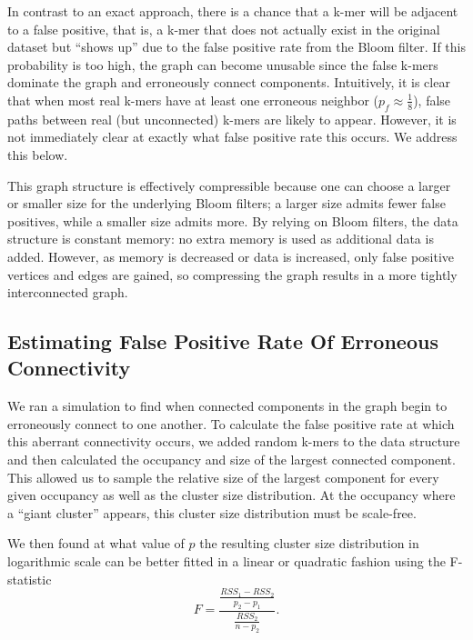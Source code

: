 \documentclass[12pt]{article} \usepackage{simplemargins}
\begin{document}
In contrast to an exact approach, there is a chance that a k-mer 
will be adjacent to a false positive,
that is, a k-mer
that does not actually exist in the original dataset but ``shows up'' 
due to the false
positive rate from the Bloom filter. If this probability is too high, the 
graph can become unusable since the false k-mers dominate the graph 
and erroneously connect components.
Intuitively, it is clear that when most real k-mers
have at least one erroneous neighbor ($p_f \approx \frac{1}{8}$), 
false paths between real (but unconnected) k-mers are likely to 
appear. However, it is not immediately clear at exactly what 
false positive rate this occurs. We address this below.  %

This graph structure is effectively compressible 
because one can choose a larger
or smaller size for the underlying Bloom filters; a larger size admits fewer
false positives, while a smaller size admits more. By relying on Bloom
filters, the data structure is constant memory: no extra memory is
used as additional data is added. However, as memory is decreased or data
is increased, only false positive vertices and edges are gained, so
compressing the graph results in a more tightly interconnected graph.

\subsection{Estimating False Positive Rate Of Erroneous Connectivity}
We ran a simulation to find when connected components in the graph 
begin to erroneously connect to one another.
To calculate the false positive rate at which this aberrant 
connectivity occurs, 
we added random k-mers to the data structure 
and then calculated the occupancy and size of 
the largest connected 
component. This allowed us to sample the relative size of 
the largest component for every 
given occupancy as well as the cluster size distribution. 
At the occupancy where a ``giant cluster'' appears, this cluster size distribution 
must be scale-free\cite{stauffer1979scaling}. 

We then found at what value of $p$ the resulting 
cluster size distribution in logarithmic 
scale can be better fitted in a linear or quadratic fashion using 
the F-statistic
\newline
\newline
\begin{displaymath}
F=\frac{\frac{RSS_1-RSS_2}{p_2-p_1}}{\frac{RSS_2}{n-p_2}}.
\end{displaymath}
\end{document}
